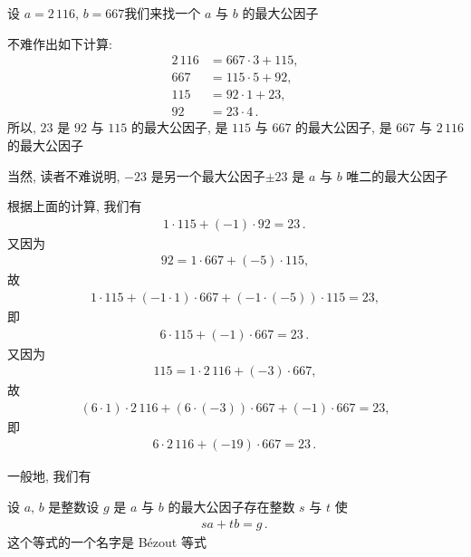 \begin{example}
    设 $a = 2\,116$, $b = 667$\period 我们来找一个 $a$ 与 $b$ 的最大公因子\period

    不难作出如下计算:
    \begin{align*}
        2\,116 & = 667 \cdot 3 + 115, \\
        667    & = 115 \cdot 5 + 92,  \\
        115    & = 92 \cdot 1 + 23,   \\
        92     & = 23 \cdot 4 \period
    \end{align*}
    所以, $23$ 是 $92$ 与 $115$ 的最大公因子, 是 $115$ 与 $667$ 的最大公因子, 是 $667$ 与 $2\,116$ 的最大公因子\period

    当然, 读者不难说明, $-23$ 是另一个最大公因子\period $\pm 23$ 是 $a$ 与 $b$ 唯二的最大公因子\period
\end{example}

根据上面的计算, 我们有
\begin{align*}
    1 \cdot 115 + (-1) \cdot 92 = 23 \period
\end{align*}
又因为
\begin{align*}
    92 = 1 \cdot 667 + (-5) \cdot 115,
\end{align*}
故
\begin{align*}
    1 \cdot 115 + (-1 \cdot 1) \cdot 667 + (-1 \cdot (-5)) \cdot 115 = 23,
\end{align*}
即
\begin{align*}
    6 \cdot 115 + (-1) \cdot 667 = 23 \period
\end{align*}
又因为
\begin{align*}
    115 = 1 \cdot 2\,116 + (-3) \cdot 667,
\end{align*}
故
\begin{align*}
    (6 \cdot 1) \cdot 2\,116 + (6 \cdot (-3)) \cdot 667 + (-1) \cdot 667 = 23,
\end{align*}
即
\begin{align*}
    6 \cdot 2\,116 + (-19) \cdot 667 = 23 \period
\end{align*}

一般地, 我们有
\begin{proposition}
    设 $a$, $b$ 是整数\period 设 $g$ 是 $a$ 与 $b$ 的最大公因子\period 存在整数 $s$ 与 $t$ 使
    \begin{align*}
        sa + tb = g \period
    \end{align*}
    这个等式的一个名字是 Bézout 等式 \period
\end{proposition}

